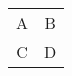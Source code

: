 \documentclass{article}
\begin{document}
\begin{tabular}{cc}
A & B \\
C & D \\
\end{tabular} 
\end{document}
